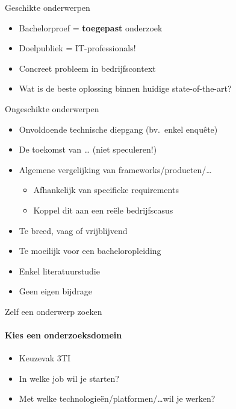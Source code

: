 \documentclass[aspectratio=169]{beamer}
\begin{document}
\begin{frame}{Geschikte onderwerpen}

  \begin{itemize}
    \item Bachelorproef = \textbf{toegepast} onderzoek
    \item Doelpubliek = IT-professionals!
    \item Concreet probleem in bedrijfscontext
    \item Wat is de beste oplossing binnen huidige state-of-the-art?
  \end{itemize}

  \bigskip

\end{frame}

\begin{frame}{Ongeschikte onderwerpen}

  \begin{itemize}
    \item Onvoldoende technische diepgang (bv.\ enkel enquête)
    \item De toekomst van \ldots{} (niet speculeren!)
    \item Algemene vergelijking van frameworks/producten/\ldots
          \begin{itemize}
            \item Afhankelijk van specifieke requirements
            \item Koppel dit aan een reële bedrijfscasus
          \end{itemize}
    \item Te breed, vaag of vrijblijvend
    \item Te moeilijk voor een bacheloropleiding
    \item Enkel literatuurstudie
    \item Geen eigen bijdrage
  \end{itemize}

\end{frame}

\begin{frame}{Zelf een onderwerp zoeken}
  \framesubtitle{Kies een onderzoeksdomein}

  \begin{itemize}
    \item Keuzevak 3TI
    \item In welke job wil je starten?
    \item Met welke technologieën/platformen/\ldots wil je werken?
  \end{itemize}

\end{frame}
\end{document}

